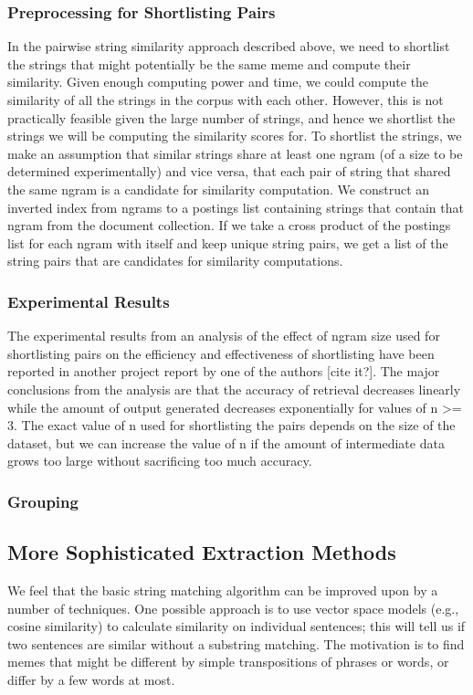 \documentclass{acm_proc_article-sp}
\begin{document}
\subsubsection{Preprocessing for Shortlisting Pairs}
In the pairwise string similarity approach described above, we need to shortlist the strings that might potentially be the same meme and compute their similarity. Given enough computing power and time, we could compute the similarity of all the strings in the corpus with each other. However, this is not practically feasible given the large number of strings, and hence we shortlist the strings we will be computing the similarity scores for. To shortlist the strings, we make an assumption that similar strings share at least one ngram (of a size to be determined experimentally) and vice versa, that each pair of string that shared the same ngram is a candidate for similarity computation. We construct an inverted index from ngrams to a postings list containing strings that contain that ngram from the document collection. If we take a cross product of the postings list for each ngram with itself and keep unique string pairs, we get a list of the string pairs that are candidates for similarity computations.

\subsubsection{Experimental Results}
The experimental results from an analysis of the effect of ngram size used for shortlisting pairs on the efficiency and effectiveness of shortlisting have been reported in another project report by one of the authors [cite it?]. The major conclusions from the analysis are that the accuracy of retrieval decreases linearly while the amount of output generated decreases exponentially for values of n >= 3. The exact value of n used for shortlisting the pairs depends on the size of the dataset, but we can increase the value of n if the amount of intermediate data grows too large without sacrificing too much accuracy.


\subsubsection{Grouping}


\subsection{More Sophisticated Extraction Methods}
We feel that the basic string matching algorithm can be improved upon by a number of techniques. One possible approach is to use vector space models (e.g., cosine similarity) to calculate similarity on individual sentences; this will tell us if two sentences are similar without a substring matching. The motivation is to find memes that might be different by simple transpositions of phrases or words, or differ by a few words at most.
\end{document}
